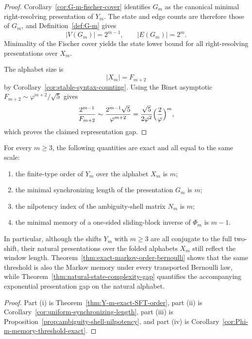 \begin{proof}
Corollary~\ref{cor:G-m-fischer-cover} identifies $G_m$ as the canonical minimal
right-resolving presentation of $Y_m$.  The state and edge counts are therefore
those of $G_m$, and Definition~\ref{def:G-m} gives
\[
\lvert V(G_m)\rvert=2^{m-1},
\qquad
\lvert E(G_m)\rvert=2^m.
\]
Minimality of the Fischer cover yields the state lower bound for all
right-resolving presentations over $X_m$.

The alphabet size is
\[
\lvert X_m\rvert=F_{m+2}
\]
by Corollary~\ref{cor:stable-syntax-counting}.  Using the Binet asymptotic
$F_{m+2}\sim \varphi^{m+2}/\sqrt5$ gives
\[
\frac{2^{m-1}}{F_{m+2}}
\sim
\frac{2^{m-1}\sqrt5}{\varphi^{m+2}}
=
\frac{\sqrt5}{2\varphi^2}\Bigl(\frac{2}{\varphi}\Bigr)^m,
\]
which proves the claimed representation gap.
\end{proof}

\begin{corollary}
\label{cor:local-complexity-scale-coincidence}
For every $m\ge 3$, the following quantities are exact and all equal to the
same scale:
\begin{enumerate}[label=\textup{(\roman*)}]
\item the finite-type order of $Y_m$ over the alphabet $X_m$ is $m$;
\item the minimal synchronizing length of the presentation $G_m$ is $m$;
\item the nilpotency index of the ambiguity-shell matrix $N_m$ is $m$;
\item the minimal memory of a one-sided sliding-block inverse of $\Phi_m$ is
$m-1$.
\end{enumerate}
In particular, although the shifts $Y_m$ with $m\ge 3$ are all conjugate to the
full two-shift, their natural presentations over the folded alphabets $X_m$
still reflect the window length.  Theorem~\ref{thm:exact-markov-order-bernoulli}
shows that the same threshold is also the Markov memory under every transported
Bernoulli law, while
Theorem~\ref{thm:natural-state-complexity-gap} quantifies the accompanying
exponential presentation gap on the natural alphabet.
\end{corollary}

\begin{proof}
Part \textup{(i)} is Theorem~\ref{thm:Y-m-exact-SFT-order},
part \textup{(ii)} is Corollary~\ref{cor:uniform-synchronizing-length},
part \textup{(iii)} is Proposition~\ref{prop:ambiguity-shell-nilpotency}, and
part \textup{(iv)} is Corollary~\ref{cor:Phi-m-memory-threshold-exact}.
\end{proof}
